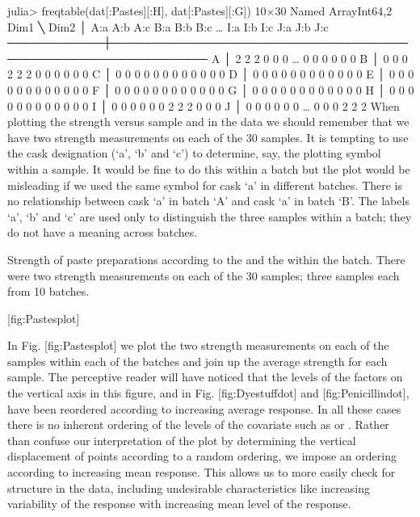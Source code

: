 julia> freqtable(dat[:Pastes][:H], dat[:Pastes][:G])
10×30 Named Array{Int64,2}
Dim1 ╲ Dim2 │ A:a  A:b  A:c  B:a  B:b  B:c  …  I:a  I:b  I:c  J:a  J:b  J:c
────────────┼──────────────────────────────────────────────────────────────
A           │   2    2    2    0    0    0  …    0    0    0    0    0    0
B           │   0    0    0    2    2    2       0    0    0    0    0    0
C           │   0    0    0    0    0    0       0    0    0    0    0    0
D           │   0    0    0    0    0    0       0    0    0    0    0    0
E           │   0    0    0    0    0    0       0    0    0    0    0    0
F           │   0    0    0    0    0    0       0    0    0    0    0    0
G           │   0    0    0    0    0    0       0    0    0    0    0    0
H           │   0    0    0    0    0    0       0    0    0    0    0    0
I           │   0    0    0    0    0    0       2    2    2    0    0    0
J           │   0    0    0    0    0    0  …    0    0    0    2    2    2
When plotting the strength versus sample and in the data we should remember that we have two strength measurements on each of the 30 samples. It is tempting to use the cask designation (‘a’, ‘b’ and ‘c’) to determine, say, the plotting symbol within a sample. It would be fine to do this within a batch but the plot would be misleading if we used the same symbol for cask ‘a’ in different batches. There is no relationship between cask ‘a’ in batch ‘A’ and cask ‘a’ in batch ‘B’. The labels ‘a’, ‘b’ and ‘c’ are used only to distinguish the three samples within a batch; they do not have a meaning across batches.

Strength of paste preparations according to the and the within the batch. There were two strength measurements on each of the 30 samples; three samples each from 10 batches.

[fig:Pastesplot]

In Fig. [fig:Pastesplot] we plot the two strength measurements on each of the samples within each of the batches and join up the average strength for each sample. The perceptive reader will have noticed that the levels of the factors on the vertical axis in this figure, and in Fig. [fig:Dyestuffdot] and [fig:Penicillindot], have been reordered according to increasing average response. In all these cases there is no inherent ordering of the levels of the covariate such as or . Rather than confuse our interpretation of the plot by determining the vertical displacement of points according to a random ordering, we impose an ordering according to increasing mean response. This allows us to more easily check for structure in the data, including undesirable characteristics like increasing variability of the response with increasing mean level of the response.

